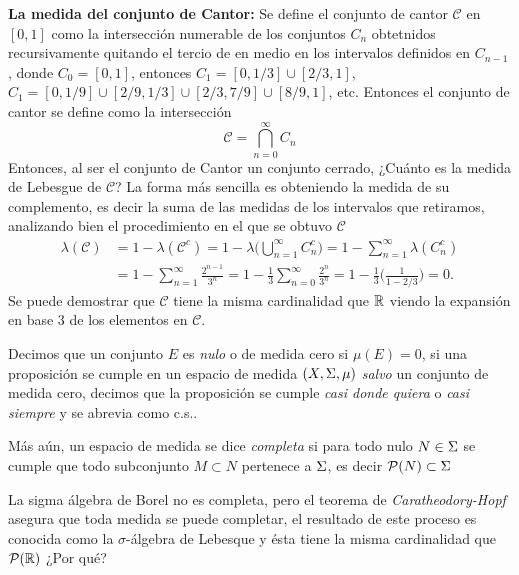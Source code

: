 \documentclass[main.tex]{subfiles}
\begin{document}
\eje \textbf{La medida del conjunto de Cantor:} Se define el conjunto de cantor $\mathcal{C}$ en $[0,1]$ como la intersección numerable de los conjuntos $C_n$ obtetnidos recursivamente quitando el tercio de en medio en los intervalos definidos en $C_{n-1}$, donde $C_0=[0,1]$, entonces $C_1=[0,1/3]\cup[2/3,1]$, $C_1=[0,1/9]\cup[2/9,1/3]\cup[2/3,7/9]\cup[8/9,1]$, etc. Entonces el conjunto de cantor se define como la intersección
\[
\mathcal{C}=\bigcap_{n=0}^{\infty}C_n
\]
Entonces, al ser el conjunto de Cantor un conjunto cerrado, ¿Cuánto es la medida de Lebesgue de $\mathcal{C}$? La forma más sencilla es obteniendo la medida de su complemento, es decir la suma de las medidas de los intervalos que retiramos, analizando bien el procedimiento en el que se obtuvo $\mathcal{C}$
\begin{align*}
\lambda(\mathcal{C})&=1-\lambda(\mathcal{C}^c)=1-\lambda\Big(\bigcup_{n=1}^{\infty}C_n^c\Big)=1-\sum_{n=1}^{\infty}\lambda({C_n^c})\\
                    &=1-\sum_{n=1}^{\infty}\frac{2^{n-1}}{3^n}=1-\frac{1}{3}\sum_{n=0}^{\infty}\frac{2^{n}}{3^n}=1-\frac{1}{3}\Big(\frac{1}{1-2/3}\Big)=0.
\end{align*}
\obs Se puede demostrar que $\mathcal{C}$ tiene la misma cardinalidad que $\mathbb R $ viendo la expansión en base $3$ de los elementos en $\mathcal{C}$.
\begin{def.}
Decimos que un conjunto $E$ es \emph{nulo} o de medida cero si $\mu(E)=0$, si una proposición se cumple en un espacio de medida $(X,\Sigma,\mu)$ \emph{salvo} un conjunto de medida cero, decimos que la proposición se cumple \emph{casi donde quiera} o \emph{casi siempre} y se abrevia como c.s..

  Más aún, un espacio de medida se dice \emph{completa} si para todo nulo $N\in\Sigma$ se cumple que todo subconjunto $M\subset N$ pertenece a $\Sigma$, es decir $\mathcal{P}(N)\subset\Sigma$
\end{def.}
\obs La sigma álgebra de Borel no es completa, pero el teorema de \emph{Caratheodory-Hopf} asegura que toda medida se puede completar, el resultado de este proceso es conocida como la $\sigma$-álgebra de Lebesque y ésta tiene la misma cardinalidad que $\mathcal{P}(\mathbb R )$ ¿Por qué?
\end{document}
